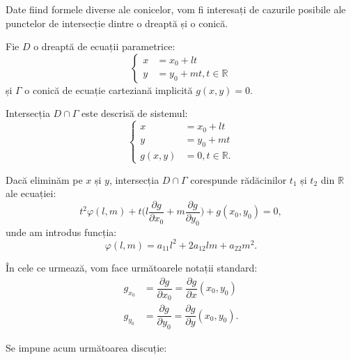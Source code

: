 \indent\indent Date fiind formele diverse ale conicelor, vom fi interesați de
cazurile posibile ale punctelor de intersecție dintre o dreaptă și o conică.

Fie $D$ o dreaptă de ecuații parametrice: 
 \[
	\begin{cases}	
	    x &= x_0 + lt \\
	    y &= y_0 + mt, t \in \mathbb{R}
    \end{cases}
\]
și $\Gamma$ o conică de ecuație carteziană implicită $g(x, y) = 0$.

Intersecția $D \cap \Gamma$ este descrisă de sistemul: 
 \[
	\begin{cases}	
	    x &= x_0 + lt \\
	    y &= y_0 + mt \\
	    g(x,y) &= 0, t \in \mathbb{R}.
    \end{cases}
\]

Dacă eliminăm pe $x$ și $y$, intersecția $D \cap \Gamma$ corespunde rădăcinilor
$t_1$ și $t_2$ din $\mathbb{R}$ ale ecuației:
\begin{equation}
    \label{equation:conica-dreapta}
	t^2 \varphi(l, m) + t \Big( l \dfrac{\partial g}{\partial x_0} +
	m \dfrac{\partial g}{\partial y_0} \Big) + g(x_0, y_0) = 0,
\end{equation}
unde am introdus funcția: \[
    \varphi(l, m) = a_{11} l^2 + 2a_{12} lm + a_{22} m^2.
\]

În cele ce urmează, vom face următoarele notații standard:
\begin{align*}
	g_{x_0} &= \dfrac{\partial g}{\partial x_0} = 
            	\dfrac{\partial g}{\partial x}(x_0, y_0) \\
    g_{y_0} &= \dfrac{\partial g}{\partial y_0} = 
                \dfrac{\partial g}{\partial y}(x_0, y_0).
\end{align*}

Se impune acum următoarea discuție:

